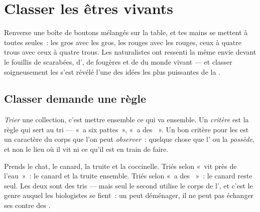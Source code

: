 \chapter{Classer les êtres vivants}\label{ch:g3:sorting-living-things}

Renverse une boîte de boutons mélangés sur la table, et tes mains se
mettent à  toutes seules~: les gros avec les gros, les rouges
avec les rouges, ceux à quatre trous avec ceux à quatre trous. Les
naturalistes ont ressenti la même envie devant le fouillis de
scarabées, d', de fougères et de  du monde vivant ---
et classer soigneusement les  s'est révélé l'une des
idées les plus puissantes de la .

\section{Classer demande une règle}

\begin{definition}\label{def:g3:sorting-living-things:criterion}
\emph{Trier} une collection, c'est mettre ensemble ce
qui va ensemble. Un \emph{critère} est la règle qui
sert au tri --- «~a six pattes~», «~a des ~». Un bon critère
pour les  est un caractère du corps que l'on peut
\emph{observer}~: quelque chose que l' ou la 
\emph{possède}, et non le lieu où il vit ni ce qu'il est en train de
faire.
\end{definition}

\begin{example}\label{ex:g3:sorting-living-things:two}
Prends le chat, le canard, la truite et la coccinelle. Triés selon
«~vit près de l'eau~»~: le canard et la truite ensemble. Triés selon
«~a des ~»~: le canard reste seul. Les deux sont des tris ---
mais seul le second utilise le corps de l', et c'est le genre
auquel les biologistes se fient~: un  peut déménager, il ne
peut pas échanger ses  contre des .
\end{example}

